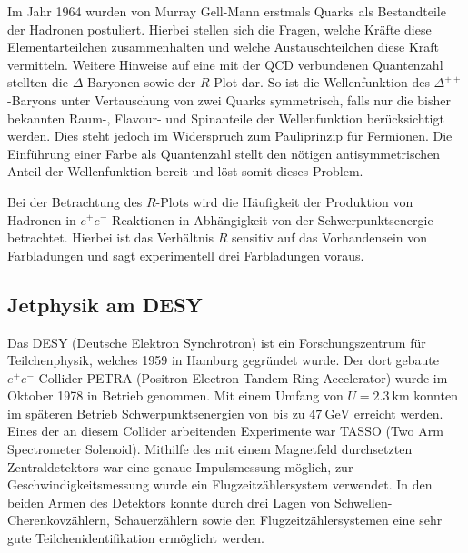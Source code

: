 Im Jahr 1964 wurden von Murray Gell-Mann erstmals Quarks als Bestandteile der Hadronen postuliert.
Hierbei stellen sich die Fragen, welche Kräfte diese Elementarteilchen zusammenhalten und welche Austauschteilchen diese Kraft vermitteln.
Weitere Hinweise auf eine mit der QCD verbundenen Quantenzahl stellten die $\Delta$-Baryonen sowie der $R$-Plot dar.
So ist die Wellenfunktion des $\Delta^{++}$-Baryons unter Vertauschung von zwei Quarks symmetrisch, falls nur die bisher bekannten Raum-, Flavour- und Spinanteile der Wellenfunktion berücksichtigt werden.
Dies steht jedoch im Widerspruch zum Pauliprinzip für Fermionen.
Die Einführung einer Farbe als Quantenzahl stellt den nötigen antisymmetrischen Anteil der Wellenfunktion bereit und löst somit dieses Problem.

Bei der Betrachtung des $R$-Plots wird die Häufigkeit der Produktion von Hadronen in $e^+ e^-$ Reaktionen in Abhängigkeit von der Schwerpunktsenergie betrachtet.
Hierbei ist das Verhältnis $R$ sensitiv auf das Vorhandensein von Farbladungen und sagt experimentell drei Farbladungen voraus.

\subsection{Jetphysik am DESY}
Das DESY (Deutsche Elektron Synchrotron) ist ein Forschungszentrum für Teilchenphysik, welches 1959 in Hamburg gegründet wurde.
Der dort gebaute $e^+ e^-$ Collider PETRA (Positron-Electron-Tandem-Ring Accelerator) wurde im Oktober 1978 in Betrieb genommen.
Mit einem Umfang von $U=\SI{2.3}{\kilo\metre}$ konnten im späteren Betrieb Schwerpunktsenergien von bis zu $\SI{47}{\giga\electronvolt}$ erreicht werden.
Eines der an diesem Collider arbeitenden Experimente war TASSO (Two Arm Spectrometer Solenoid).
Mithilfe des mit einem Magnetfeld durchsetzten Zentraldetektors war eine genaue Impulsmessung möglich, zur Geschwindigkeitsmessung wurde ein Flugzeitzählersystem verwendet.
In den beiden Armen des Detektors konnte durch drei Lagen von Schwellen-Cherenkovzählern, Schauerzählern sowie den Flugzeitzählersystemen eine sehr gute Teilchenidentifikation ermöglicht werden.

